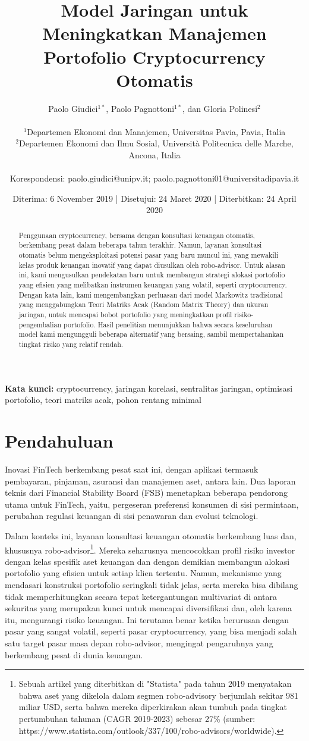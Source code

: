 \documentclass[12pt,a4paper]{article}
\title{\textbf{Model Jaringan untuk Meningkatkan Manajemen Portofolio Cryptocurrency Otomatis}}
\author{
Paolo Giudici$^{1*}$, Paolo Pagnottoni$^{1*}$, dan Gloria Polinesi$^{2}$ \\
\\
\small $^{1}$Departemen Ekonomi dan Manajemen, Universitas Pavia, Pavia, Italia \\
\small $^{2}$Departemen Ekonomi dan Ilmu Sosial, Università Politecnica delle Marche, Ancona, Italia \\
\\
\small *Korespondensi: paolo.giudici@unipv.it; paolo.pagnottoni01@universitadipavia.it
}
\date{Diterima: 6 November 2019 | Disetujui: 24 Maret 2020 | Diterbitkan: 24 April 2020}
\begin{document}
\maketitle

\begin{abstract}
Penggunaan cryptocurrency, bersama dengan konsultasi keuangan otomatis, berkembang pesat dalam beberapa tahun terakhir. Namun, layanan konsultasi otomatis belum mengeksploitasi potensi pasar yang baru muncul ini, yang mewakili kelas produk keuangan inovatif yang dapat diusulkan oleh robo-advisor. Untuk alasan ini, kami mengusulkan pendekatan baru untuk membangun strategi alokasi portofolio yang efisien yang melibatkan instrumen keuangan yang volatil, seperti cryptocurrency. Dengan kata lain, kami mengembangkan perluasan dari model Markowitz tradisional yang menggabungkan Teori Matriks Acak (Random Matrix Theory) dan ukuran jaringan, untuk mencapai bobot portofolio yang meningkatkan profil risiko-pengembalian portofolio. Hasil penelitian menunjukkan bahwa secara keseluruhan model kami mengungguli beberapa alternatif yang bersaing, sambil mempertahankan tingkat risiko yang relatif rendah.
\end{abstract}

\textbf{Kata kunci:} cryptocurrency, jaringan korelasi, sentralitas jaringan, optimisasi portofolio, teori matriks acak, pohon rentang minimal

\section{Pendahuluan}

Inovasi FinTech berkembang pesat saat ini, dengan aplikasi termasuk pembayaran, pinjaman, asuransi dan manajemen aset, antara lain. Dua laporan teknis dari Financial Stability Board (FSB)\cite{fsb2017a,fsb2017b} menetapkan beberapa pendorong utama untuk FinTech, yaitu, pergeseran preferensi konsumen di sisi permintaan, perubahan regulasi keuangan di sisi penawaran dan evolusi teknologi.

Dalam konteks ini, layanan konsultasi keuangan otomatis berkembang luas dan, khususnya robo-advisor\footnote{Sebuah artikel yang diterbitkan di "Statista" pada tahun 2019 menyatakan bahwa aset yang dikelola dalam segmen robo-advisory berjumlah sekitar 981 miliar USD, serta bahwa mereka diperkirakan akan tumbuh pada tingkat pertumbuhan tahunan (CAGR 2019-2023) sebesar 27\% (sumber: https://www.statista.com/outlook/337/100/robo-advisors/worldwide).}. Mereka seharusnya mencocokkan profil risiko investor dengan kelas spesifik aset keuangan dan dengan demikian membangun alokasi portofolio yang efisien untuk setiap klien tertentu. Namun, mekanisme yang mendasari konstruksi portofolio seringkali tidak jelas, serta mereka bisa dibilang tidak memperhitungkan secara tepat ketergantungan multivariat di antara sekuritas yang merupakan kunci untuk mencapai diversifikasi dan, oleh karena itu, mengurangi risiko keuangan. Ini terutama benar ketika berurusan dengan pasar yang sangat volatil, seperti pasar cryptocurrency, yang bisa menjadi salah satu target pasar masa depan robo-advisor, mengingat pengaruhnya yang berkembang pesat di dunia keuangan.
\end{document}
